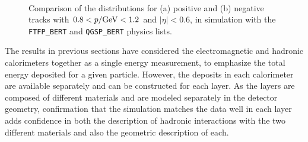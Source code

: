 \begin{figure}[ht]
\centering
{}
~
\caption{ Comparison of the \ep distributions for (a) positive and (b) negative tracks with $0.8< p/\mathrm{Ge\kern -0.05em V}<1.2$ and $|\eta|<0.6$, in simulation with the \texttt{FTFP\_BERT} and \texttt{QGSP\_BERT} physics lists.}
\label{fig:eoverp_charge}
\end{figure}

The \epav results in previous sections have considered the electromagnetic and hadronic calorimeters together as a single energy measurement, to emphasize the total energy deposited for a given particle. 
However, the deposits in each calorimeter are available separately and \epav can be constructed for each layer. 
As the layers are composed of different materials and are modeled separately in the detector geometry, confirmation that the simulation matches the data well in each layer adds confidence in both the description of hadronic interactions with the two different materials and also the geometric description of each. 

